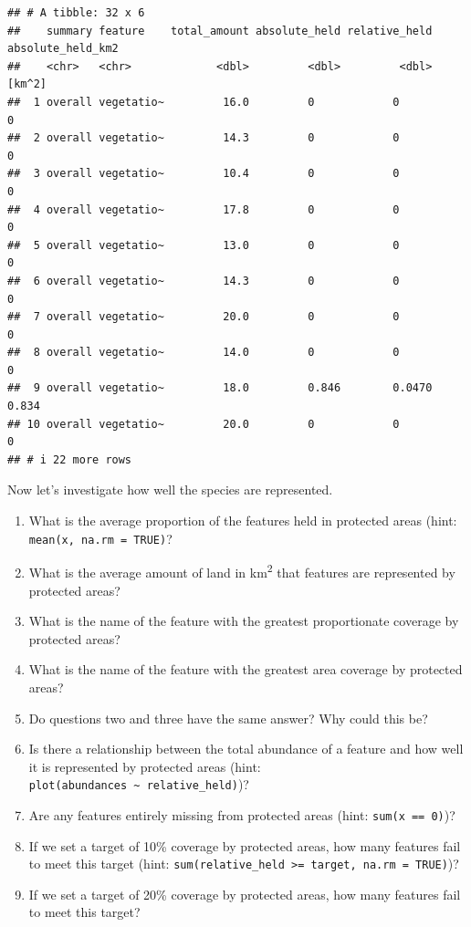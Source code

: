 \documentclass[12pt,]{book}
\makeatletter
\providecommand{\tightlist}{%
  \setlength{\itemsep}{0pt}\setlength{\parskip}{0pt}}
\newenvironment{kframe}{%
\medskip{}
\setlength{\fboxsep}{.8em}
 \def\at@end@of@kframe{}%
 \ifinner\ifhmode%
  \def\at@end@of@kframe{\end{minipage}}%
  \begin{minipage}{\columnwidth}%
 \fi\fi%
 \def\FrameCommand##1{\hskip\@totalleftmargin \hskip-\fboxsep
 \colorbox{shadecolor}{##1}\hskip-\fboxsep
     \hskip-\linewidth \hskip-\@totalleftmargin \hskip\columnwidth}%
 \MakeFramed {\advance\hsize-\width
   \@totalleftmargin\z@ \linewidth\hsize
   \@setminipage}}%
 {\par\unskip\endMakeFramed%
 \at@end@of@kframe}
\newenvironment{rmdblock}[1]
  {
  \begin{itemize}
  \renewcommand{\labelitemi}{
    \raisebox{-.7\height}[0pt][0pt]{
      {\setkeys{Gin}{width=3em,keepaspectratio}\texttt{[image: images/\#1]}}
    }
  }
  \setlength{\fboxsep}{1em}
  \begin{kframe}
  \item
  }
  {
  \end{kframe}
  \end{itemize}
  }
\newenvironment{rmdquestion}
  {\begin{rmdblock}{question}}
  {\end{rmdblock}}
\makeatother
\begin{document}
\begin{verbatim}
## # A tibble: 32 x 6
##    summary feature    total_amount absolute_held relative_held absolute_held_km2
##    <chr>   <chr>             <dbl>         <dbl>         <dbl>            [km^2]
##  1 overall vegetatio~         16.0         0            0                  0    
##  2 overall vegetatio~         14.3         0            0                  0    
##  3 overall vegetatio~         10.4         0            0                  0    
##  4 overall vegetatio~         17.8         0            0                  0    
##  5 overall vegetatio~         13.0         0            0                  0    
##  6 overall vegetatio~         14.3         0            0                  0    
##  7 overall vegetatio~         20.0         0            0                  0    
##  8 overall vegetatio~         14.0         0            0                  0    
##  9 overall vegetatio~         18.0         0.846        0.0470             0.834
## 10 overall vegetatio~         20.0         0            0                  0    
## # i 22 more rows
\end{verbatim}

Now let's investigate how well the species are represented.

\begin{rmdquestion}
\begin{enumerate}
\def\labelenumi{\arabic{enumi}.}
\tightlist
\item
  What is the average proportion of the features held in protected areas (hint: \texttt{mean(x,\ na.rm\ =\ TRUE)}?
\item
  What is the average amount of land in km\textsuperscript{2} that features are represented by protected areas?
\item
  What is the name of the feature with the greatest proportionate coverage by protected areas?
\item
  What is the name of the feature with the greatest area coverage by protected areas?
\item
  Do questions two and three have the same answer? Why could this be?
\item
  Is there a relationship between the total abundance of a feature and how well it is represented by protected areas (hint: \texttt{plot(abundances\ \textasciitilde{}\ relative\_held)})?
\item
  Are any features entirely missing from protected areas (hint: \texttt{sum(x\ ==\ 0)})?
\item
  If we set a target of 10\% coverage by protected areas, how many features fail to meet this target (hint: \texttt{sum(relative\_held\ \textgreater{}=\ target,\ na.rm\ =\ TRUE)})?
\item
  If we set a target of 20\% coverage by protected areas, how many features fail to meet this target?
\end{enumerate}
\end{rmdquestion}
\end{document}

